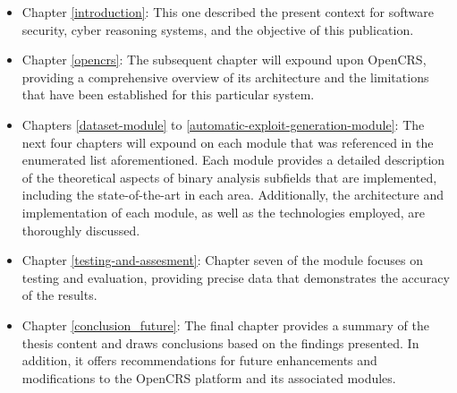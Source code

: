 \documentclass[../main.tex]{subfiles}
\begin{document}
\begin{itemize}
    \item Chapter \ref{introduction}: This one described the present context for software security, cyber reasoning systems, and the objective of this publication.
    \item Chapter \ref{opencrs}: The subsequent chapter will expound upon OpenCRS, providing a comprehensive overview of its architecture and the limitations that have been established for this particular system.
    \item Chapters \ref{dataset-module} to \ref{automatic-exploit-generation-module}: The next four chapters will expound on each module that was referenced in the enumerated list aforementioned. Each module provides a detailed description of the theoretical aspects of binary analysis subfields that are implemented, including the state-of-the-art in each area. Additionally, the architecture and implementation of each module, as well as the technologies employed, are thoroughly discussed.
    \item Chapter \ref{testing-and-assesment}: Chapter seven of the module focuses on testing and evaluation, providing precise data that demonstrates the accuracy of the results.
    \item Chapter \ref{conclusion_future}: The final chapter provides a summary of the thesis content and draws conclusions based on the findings presented. In addition, it offers recommendations for future enhancements and modifications to the OpenCRS platform and its associated modules.
\end{itemize}
\end{document}
